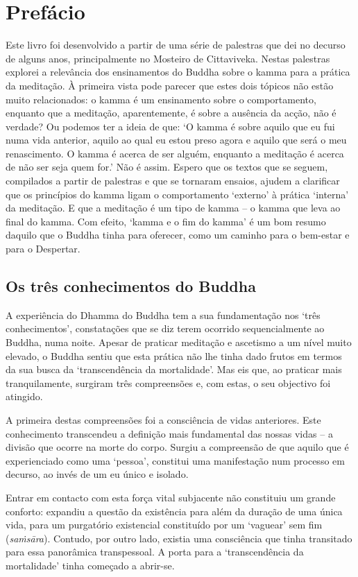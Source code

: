 \chapter{Prefácio}

Este livro foi desenvolvido a partir de uma série de palestras que dei no
decurso de alguns anos, principalmente no Mosteiro de Cittaviveka. Nestas
palestras explorei a relevância dos ensinamentos do Buddha sobre o kamma para a
prática da meditação. À primeira vista pode parecer que estes dois tópicos não
estão muito relacionados: o kamma é um ensinamento sobre o comportamento,
enquanto que a meditação, aparentemente, é sobre a ausência da acção, não é
verdade? Ou podemos ter a ideia de que: `O kamma é sobre aquilo que eu fui numa
vida anterior, aquilo ao qual eu estou preso agora e aquilo que será o meu
renascimento. O kamma é acerca de ser alguém, enquanto a meditação é acerca de
não ser seja quem for.' Não é assim. Espero que os textos que se seguem,
compilados a partir de palestras e que se tornaram ensaios, ajudem a clarificar
que os princípios do kamma ligam o comportamento `externo' à prática `interna'
da meditação. E que a meditação é um tipo de kamma -- o kamma que leva ao final
do kamma. Com efeito, `kamma e o fim do kamma' é um bom resumo daquilo que o
Buddha tinha para oferecer, como um caminho para o bem-estar e para o Despertar.

\section{Os três conhecimentos do Buddha}

A experiência do Dhamma do Buddha tem a sua fundamentação nos `três
conhecimentos', constatações que se diz terem ocorrido sequencialmente ao
Buddha, numa noite. Apesar de praticar meditação e ascetismo a um nível muito
elevado, o Buddha sentiu que esta prática não lhe tinha dado frutos em termos da
sua busca da `transcendência da mortalidade'. Mas eis que, ao praticar mais
tranquilamente, surgiram três compreensões e, com estas, o seu objectivo foi
atingido.

A primeira destas compreensões foi a consciência de vidas anteriores. Este
conhecimento transcendeu a definição mais fundamental das nossas vidas -- a
divisão que ocorre na morte do corpo. Surgiu a compreensão de que aquilo que é
experienciado como uma `pessoa', constitui uma manifestação num processo em
decurso, ao invés de um eu único e isolado.

Entrar em contacto com esta força vital subjacente não constituiu um grande
conforto: expandiu a questão da existência para além da duração de uma única
vida, para um purgatório existencial constituído por um `vaguear' sem fim
(\emph{saṁsāra}). Contudo, por outro lado, existia uma consciência que tinha
transitado para essa panorâmica transpessoal. A porta para a `transcendência da
mortalidade' tinha começado a abrir-se.

